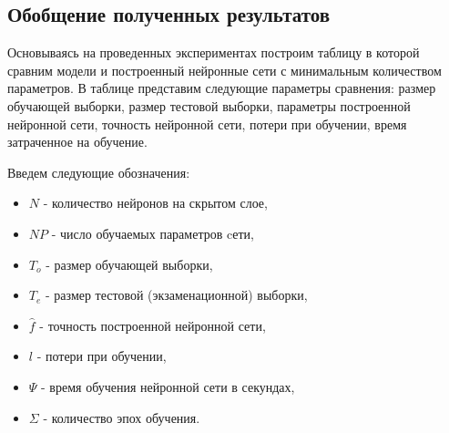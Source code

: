 \subsection{Обобщение полученных результатов}
Основываясь на проведенных экспериментах построим таблицу в которой сравним модели и построенный нейронные сети с минимальным количеством параметров.
В таблице представим следующие параметры сравнения:
размер обучающей выборки, размер тестовой выборки, параметры построенной нейронной сети, точность нейронной сети, потери при обучении, время затраченное на обучение.

\bigskip

Введем следующие обозначения:
\begin{itemize}
	\item $N$ - количество нейронов на скрытом слое,
	\item $NP$ - число обучаемых параметров cети, 
	\item $T_o$ - размер обучающей выборки,
	\item $T_e$ - размер тестовой (экзаменационной) выборки,
	\item $\hat{f}$ - точность построенной нейронной сети,
	\item $l$ - потери при обучении,
	\item $\Psi$ - время обучения нейронной сети в секундах,
	\item $\Sigma$ - количество эпох обучения.
\end{itemize}

